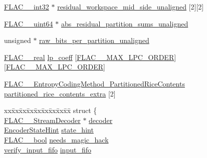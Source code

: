 \begin{DoxyCompactItemize}
\item 
\hyperlink{ordinals_8h_a33fd77bfe6d685541a0c034a75deccdc}{F\+L\+A\+C\+\_\+\+\_\+int32} $\ast$ \hyperlink{struct_f_l_a_c_____stream_encoder_private_a1cce93d12b40068f627a911b15204fe0}{residual\+\_\+workspace\+\_\+mid\+\_\+side\+\_\+unaligned} \mbox{[}2\mbox{]}\mbox{[}2\mbox{]}
\item 
\hyperlink{ordinals_8h_aa78c8c70a3eb8a58af7436f278acde8e}{F\+L\+A\+C\+\_\+\+\_\+uint64} $\ast$ \hyperlink{struct_f_l_a_c_____stream_encoder_private_a3f44b443c7ace2c39d6a099c1135d7cc}{abs\+\_\+residual\+\_\+partition\+\_\+sums\+\_\+unaligned}
\item 
unsigned $\ast$ \hyperlink{struct_f_l_a_c_____stream_encoder_private_a39d6113c9c4f939de6238ae6af988950}{raw\+\_\+bits\+\_\+per\+\_\+partition\+\_\+unaligned}
\item 
\hyperlink{float_8h_a72409a67c78d2af7d29a9e9362cd49b8}{F\+L\+A\+C\+\_\+\+\_\+real} \hyperlink{struct_f_l_a_c_____stream_encoder_private_a0f2e15cf726e73e23fb3bc5d5fb4e47a}{lp\+\_\+coeff} \mbox{[}\hyperlink{group__flac__format_ga16108d413f524329f338cff6e05f3aff}{F\+L\+A\+C\+\_\+\+\_\+\+M\+A\+X\+\_\+\+L\+P\+C\+\_\+\+O\+R\+D\+ER}\mbox{]}\mbox{[}\hyperlink{group__flac__format_ga16108d413f524329f338cff6e05f3aff}{F\+L\+A\+C\+\_\+\+\_\+\+M\+A\+X\+\_\+\+L\+P\+C\+\_\+\+O\+R\+D\+ER}\mbox{]}
\item 
\hyperlink{struct_f_l_a_c_____entropy_coding_method___partitioned_rice_contents}{F\+L\+A\+C\+\_\+\+\_\+\+Entropy\+Coding\+Method\+\_\+\+Partitioned\+Rice\+Contents} \hyperlink{struct_f_l_a_c_____stream_encoder_private_a6b1106039e03adc58874eea7893ca4b3}{partitioned\+\_\+rice\+\_\+contents\+\_\+extra} \mbox{[}2\mbox{]}
\item 
\begin{tabbing}
xx\=xx\=xx\=xx\=xx\=xx\=xx\=xx\=xx\=\kill
struct \{\\
\>\hyperlink{struct_f_l_a_c_____stream_decoder}{FLAC\_\_StreamDecoder} $\ast$ \hyperlink{struct_f_l_a_c_____stream_encoder_private_a9404f84925aef85cee4b3deb43e6ab8b}{decoder}\\
\>\hyperlink{stream__encoder_8c_abb306d9d764554cc821f1099a519145b}{EncoderStateHint} \hyperlink{struct_f_l_a_c_____stream_encoder_private_a9c2fc76b6daa63eae0ffb947da303da7}{state\_hint}\\
\>\hyperlink{ordinals_8h_a95103469f1cbd78b8cf250194985b34e}{FLAC\_\_bool} \hyperlink{struct_f_l_a_c_____stream_encoder_private_acc5846311687f296829328ec35d41ab9}{needs\_magic\_hack}\\
\>\hyperlink{structverify__input__fifo}{verify\_input\_fifo} \hyperlink{struct_f_l_a_c_____stream_encoder_private_ad80c8f346753a568b548c3aca302a23d}{input\_fifo}\\

\end{tabbing}
\end{DoxyCompactItemize}
